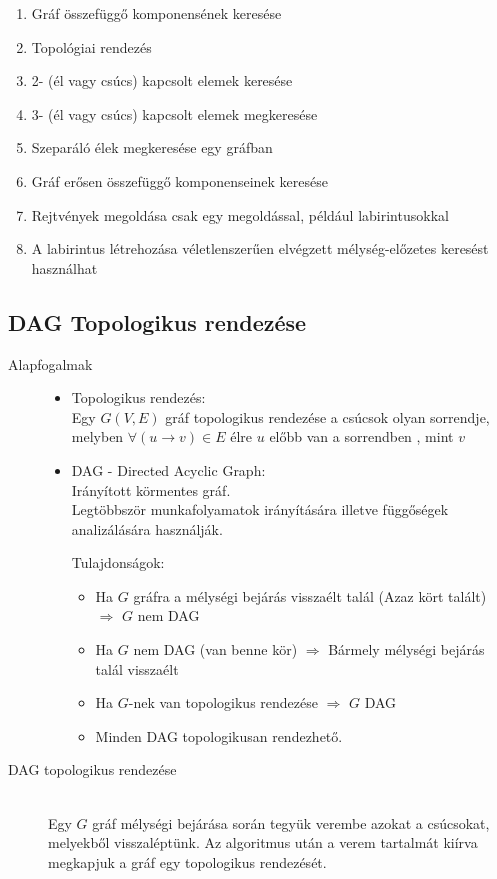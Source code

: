 \documentclass[margin=0px]{article}
\begin{document}
\begin{enumerate}
	\item Gráf összefüggő komponensének keresése
	\item Topológiai rendezés
	\item 2- (él vagy csúcs) kapcsolt elemek keresése
	\item 3- (él vagy csúcs) kapcsolt elemek megkeresése
	\item Szeparáló élek megkeresése egy gráfban
	\item Gráf erősen összefüggő komponenseinek keresése
	\item Rejtvények megoldása csak egy megoldással, például labirintusokkal
	\item A labirintus létrehozása véletlenszerűen elvégzett mélység-előzetes keresést használhat
\end{enumerate}
\subsection{DAG Topologikus rendezése}
\begin{description}
    \item[Alapfogalmak] \hfill
        \begin{itemize}
            \item Topologikus rendezés: \\
                  Egy $G(V,E)$ gráf topologikus rendezése a csúcsok olyan sorrendje, melyben $\forall (u\rightarrow v) \in E$ élre $u$ előbb van a sorrendben , mint $v$
            \item DAG - Directed Acyclic Graph: \\
                  Irányított körmentes gráf. \\
                  Legtöbbször munkafolyamatok irányítására illetve függőségek analizálására használják.

                  Tulajdonságok:
                  \begin{itemize}
                      \item Ha $G$ gráfra a mélységi bejárás visszaélt talál (Azaz kört talált) $\Longrightarrow$ $G$ nem DAG
                      \item Ha $G$ nem DAG (van benne kör) $\Longrightarrow$ Bármely mélységi bejárás talál visszaélt
                      \item Ha $G$-nek van topologikus rendezése $\Longrightarrow$ $G$ DAG
                      \item Minden DAG topologikusan rendezhető.
                  \end{itemize}
        \end{itemize}
    \item[DAG topologikus rendezése] \hfill \\
        Egy $G$ gráf mélységi bejárása során tegyük verembe azokat a csúcsokat, melyekből visszaléptünk. Az algoritmus után a verem tartalmát kiírva megkapjuk a gráf egy topologikus rendezését.
\end{description}
\end{document}
